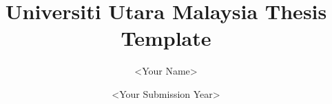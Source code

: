 \documentclass{uumthesis}
\title{Universiti Utara Malaysia Thesis Template}
\author{<Your Name>}
\date{<Your Submission Year>}
\begin{document}
\frontmatter
\maketitle





\tableofcontents
\listoftables
\listoffigures
\listofappendices




\mainmatter





%



%



\appendix


\end{document}
